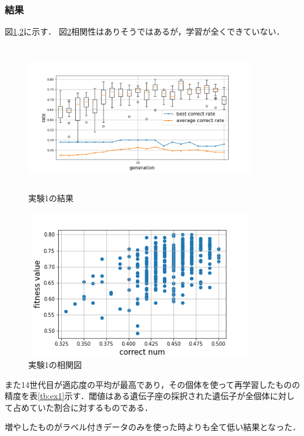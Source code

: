 \documentclass[twocolumn]{jarticle}     %
\begin{document}
\subsubsection{結果}
図\ref{fig:ex1},\ref{fig:ex1_1}に示す．
図\ref{fig:ex1_1}相関性はありそうではあるが，学習が全くできていない．
\begin{figure}[h]
	\begin{center}
		\vspace*{-3mm}
		\hspace*{-12mm}
		\includegraphics[height=65mm,width=100mm]{graph.png}
		\caption{実験1の結果\label{fig:ex1}}
	\end{center}
\end{figure}
\begin{figure}[h]
	\begin{center}
		\vspace*{-3mm}
		\hspace*{-12mm}
		\includegraphics[height=65mm,width=100mm]{img.png}
		\caption{実験1の相関図\label{fig:ex1_1}}
	\end{center}
\end{figure}
また14世代目が適応度の平均が最高であり，その個体を使って再学習したものの精度を表\ref{tb:ex1}示す．閾値はある遺伝子座の採択された遺伝子が全個体に対して占めていた割合に対するものである．
\begin{table}[h]
	\centering
	\caption{GAの設定\label{tb:ex1}}
\end{table}
増やしたものがラベル付きデータのみを使った時よりも全て低い結果となった．
\end{document}
